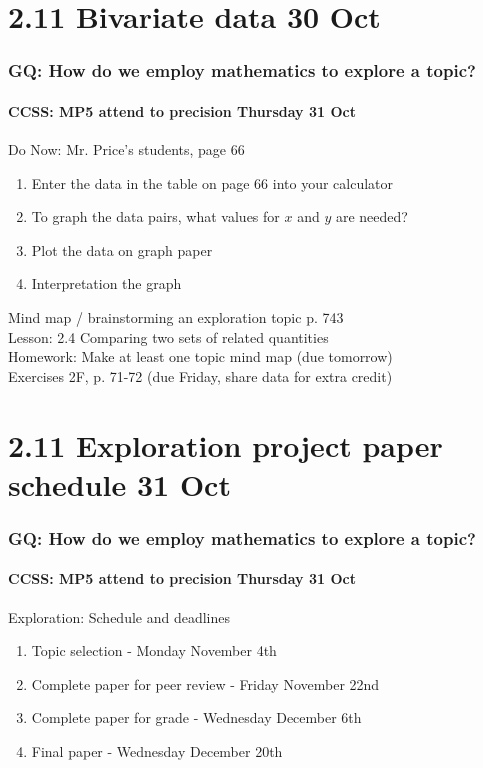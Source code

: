 \documentclass{beamer}
\begin{document}
  \section{2.11 Bivariate data 30 Oct}
  \frame
  {
    \frametitle{GQ: How do we employ mathematics to explore a topic?}
    \framesubtitle{CCSS: MP5 attend to precision \hfill \alert{Thursday 31 Oct}}

    \begin{block}{Do Now: Mr. Price's students, page 66}
    \begin{enumerate}
        \item Enter the data in the table on page 66 into your calculator
        \item To graph the data pairs, what values for $x$ and $y$ are needed?
        \item Plot the data on graph paper 
        \item Interpretation the graph
    \end{enumerate}
    \end{block}
    Mind map / brainstorming an exploration topic p. 743 \\
    Lesson: 2.4 Comparing two sets of related quantities\\ \smallskip
    Homework: Make at least one topic mind map (due tomorrow)\\
    Exercises 2F, p. 71-72 (due Friday, share data for extra credit)
  }

  \section{2.11 Exploration project paper schedule 31 Oct}
  \frame
  {
    \frametitle{GQ: How do we employ mathematics to explore a topic?}
    \framesubtitle{CCSS: MP5 attend to precision \hfill \alert{Thursday 31 Oct}}
    \begin{block}{Exploration: Schedule and deadlines}
      \begin{enumerate}
        \item Topic selection - Monday November 4th
        \item Complete paper for peer review - Friday November 22nd
        \item Complete paper for grade - Wednesday December 6th
        \item Final paper - Wednesday December 20th
      \end{enumerate}
      \end{block}
}
\end{document}
